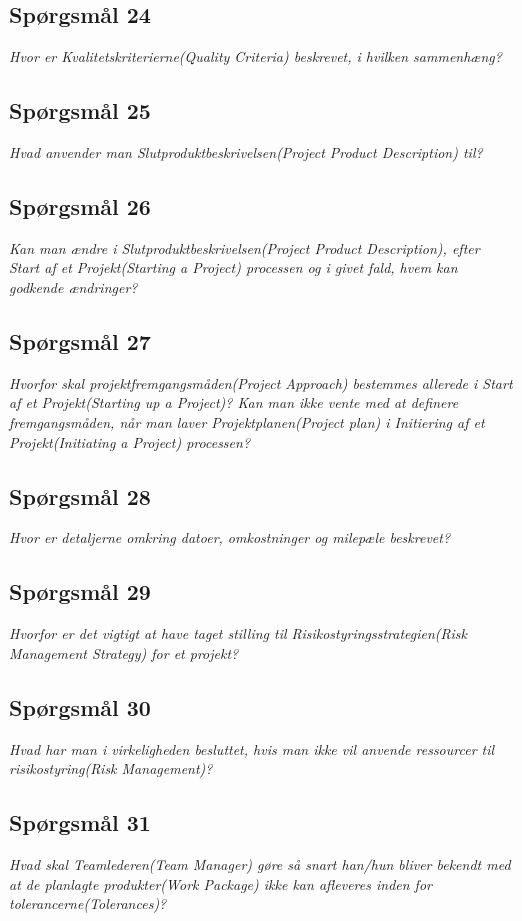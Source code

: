 \documentclass[12pt,twoside]{article}
\begin{document}
    \subsection{Spørgsmål 24}
    \textit{Hvor er Kvalitetskriterierne(Quality Criteria) beskrevet, i hvilken sammenhæng?}
    \subsection{Spørgsmål 25}
    \textit{Hvad anvender man Slutproduktbeskrivelsen(Project Product Description) til?}
    \subsection{Spørgsmål 26}
    \textit{Kan man ændre i Slutproduktbeskrivelsen(Project Product Description), efter Start af et Projekt(Starting a Project) processen og i givet fald, hvem kan godkende ændringer?}
    \subsection{Spørgsmål 27}
    \textit{Hvorfor skal projektfremgangsmåden(Project Approach) bestemmes allerede i Start af et Projekt(Starting up a Project)? Kan man ikke vente med at definere fremgangsmåden, når man laver Projektplanen(Project plan) i Initiering af et Projekt(Initiating a Project) processen?}
    \subsection{Spørgsmål 28}
    \textit{Hvor er detaljerne omkring datoer, omkostninger og milepæle beskrevet?}
    \subsection{Spørgsmål 29}
    \textit{Hvorfor er det vigtigt at have taget stilling til Risikostyringsstrategien(Risk Management Strategy) for et projekt?}
    \subsection{Spørgsmål 30}
    \textit{Hvad har man i virkeligheden besluttet, hvis man ikke vil anvende ressourcer til risikostyring(Risk Management)?}
    \subsection{Spørgsmål 31}
    \textit{Hvad skal Teamlederen(Team Manager) gøre så snart han/hun bliver bekendt med at de planlagte produkter(Work Package) ikke kan afleveres inden for tolerancerne(Tolerances)?}
\end{document}
